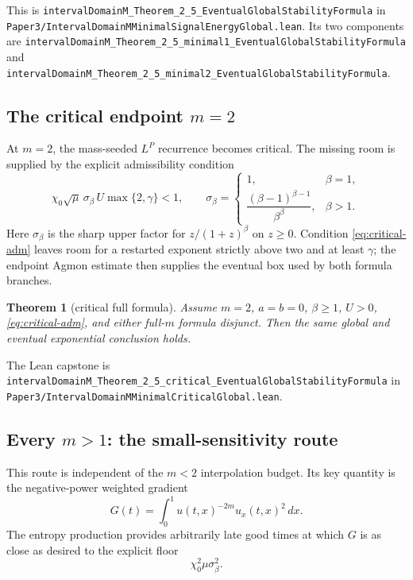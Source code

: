 \documentclass[11pt]{article}
\newcommand{\code}[1]{\nolinkurl{#1}}
\newtheorem{theorem}{Theorem}
\begin{document}
\noindent This is
\code{intervalDomainM_Theorem_2_5_EventualGlobalStabilityFormula} in
\code{Paper3/IntervalDomainMMinimalSignalEnergyGlobal.lean}.  Its two
components are
\code{intervalDomainM_Theorem_2_5_minimal1_EventualGlobalStabilityFormula}
and
\code{intervalDomainM_Theorem_2_5_minimal2_EventualGlobalStabilityFormula}.

\subsection{The critical endpoint \(m=2\)}

At \(m=2\), the mass-seeded \(L^P\) recurrence becomes critical.  The missing
room is supplied by the explicit admissibility condition
\begin{equation}
 \chi_0\sqrt\mu\,\sigma_\beta\,U\max\{2,\gamma\}<1,
 \qquad
 \sigma_\beta=
 \begin{cases}
  1,&\beta=1,\\[2mm]
  \dfrac{(\beta-1)^{\beta-1}}{\beta^\beta},&\beta>1.
 \end{cases}                                           \label{eq:critical-adm}
\end{equation}
Here \(\sigma_\beta\) is the sharp upper factor for
\(z/(1+z)^\beta\) on \(z\ge0\).  Condition
\eqref{eq:critical-adm} leaves room for a restarted exponent strictly above
two and at least \(\gamma\); the endpoint Agmon estimate then supplies the
eventual box used by both formula branches.

\begin{theorem}[critical full formula]
Assume \(m=2\), \(a=b=0\), \(\beta\ge1\), \(U>0\),
\eqref{eq:critical-adm}, and either full-\(m\) formula disjunct.  Then the
same global and eventual exponential conclusion holds.
\end{theorem}

\noindent The Lean capstone is
\code{intervalDomainM_Theorem_2_5_critical_EventualGlobalStabilityFormula}
in \code{Paper3/IntervalDomainMMinimalCriticalGlobal.lean}.

\subsection{Every \(m>1\): the small-sensitivity route}

This route is independent of the \(m<2\) interpolation budget.  Its key
quantity is the negative-power weighted gradient
\begin{equation}
 G(t)=\int_0^1u(t,x)^{-2m}u_x(t,x)^2\,dx.               \label{eq:G}
\end{equation}
The entropy production provides arbitrarily late good times at which \(G\)
is as close as desired to the explicit floor
\begin{equation}
  \chi_0^2\mu\sigma_\beta^2.                            \label{eq:floor}
\end{equation}
\end{document}

